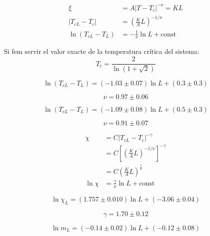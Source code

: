 \documentclass[a4paper]{article}
\begin{document}
\begin{align*}
    \xi &= A \left| T-T_c \right|^{-\nu} = KL \\
    \left|T_{cL}-T_c \right| &= \left(\frac{K}{A} L \right)^{-1/\nu} \\
    \ln \left(T_{cL} - T_L \right) &= -\frac{1}{\nu} \ln L + \text{const}
\end{align*}

Si fem servir el valor exacte de la temperatura crítica del sistema:
\begin{equation*}
	T_c = \frac{2}{\ln \left(1+\sqrt{2} \right)}
\end{equation*}

\begin{equation*}
    \ln \left(T_{cL} - T_L \right) = (-1.03 \pm 0.07) \ln L + (0.3 \pm 0.3)
\end{equation*}

\begin{equation*}
	\nu = 0.97 \pm 0.06
\end{equation*}

\begin{equation*}
    \ln \left(T_{cL} - T_L \right) = (-1.09 \pm 0.08) \ln L + (0.5 \pm 0.3)
\end{equation*}

\begin{equation*}
	\nu = 0.91 \pm 0.07
\end{equation*}

\begin{align*}
	\chi &= C \left|T_{cL}-T_c\right|^{-\gamma} \\
	&= C \left[ \left(\frac{K}{A} L \right)^{-1/\nu} \right]^{-\gamma} \\
	&= C \left(\frac{K}{A} L \right)^{\frac{\gamma}{\nu}} \\
	\ln \chi &= \frac{\gamma}{\nu} \ln L + \text{const}
\end{align*}

\begin{equation*}
	\ln \chi_L = (1.757 \pm 0.010) \ln L + (-3.06 \pm 0.04)
\end{equation*}

\begin{equation*}
	\gamma = 1.70 \pm 0.12
\end{equation*}

\begin{equation*}
	\ln m_L = (-0.14 \pm 0.02) \ln L + (-0.12 \pm 0.08)
\end{equation*}
\end{document}
